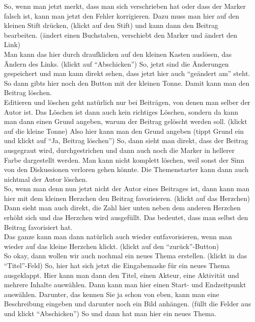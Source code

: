 \begin{itemize}
So, wenn man jetzt merkt, dass man sich verschrieben hat oder dass der Marker falsch ist, kann man jetzt den Fehler korrigieren. Dazu muss man hier auf den kleinen Stift dr{\"u}cken, (klickt auf den Stift) und kann dann den Beitrag bearbeiten. ({\"a}ndert einen Buchstaben, verschiebt den Marker und {\"a}ndert den Link)\\
Man kann das hier durch draufklicken auf den kleinen Kasten ausl{\"o}sen, das {\"A}ndern des Links. (klickt auf "`Abschicken"') So, jetzt sind die {\"A}nderungen gespeichert und man kann direkt sehen, dass jetzt hier auch "`ge{\"a}ndert am"' steht. So dann gibts hier noch den Button mit der kleinen Tonne. Damit kann man den Beitrag l{\"o}schen.\\
Editieren und l{\"o}schen geht nat{\"u}rlich nur bei Beitr{\"a}gen, von denen man selber der Autor ist. Das L{\"o}schen ist dann auch kein richtiges L{\"o}schen, sondern da kann man dann einen Grund angeben, warum der Beitrag gel{\"o}scht werden soll. (klickt auf die kleine Tonne) Also hier kann man den Grund angeben (tippt Grund ein und klickt auf "`Ja, Beitrag l{\"o}schen"') So, dann sieht man direkt, dass der Beitrag ausgegraut wird, durchgestrichen und dann auch noch die Marker in hellerer Farbe dargestellt werden. Man kann nicht komplett l{\"o}schen, weil sonst der Sinn von den Diskussionen verloren gehen k{\"o}nnte. Die Themenstarter kann dann auch nichtmal der Autor l{\"o}schen.\\
So, wenn man denn nun jetzt nicht der Autor eines Beitrages ist, dann kann man hier mit dem kleinen Herzchen den Beitrag favorisieren. (klickt auf das Herzchen) Dann sieht man auch direkt, die Zahl hier unten neben dem anderen Herzchen erh{\"o}ht sich und das Herzchen wird ausgef{\"u}llt. Das bedeutet, dass man selbst den Beitrag favorisiert hat.\\
Das ganze kann man dann nat{\"u}rlich auch wieder entfavorisieren, wenn man wieder auf das kleine Herzchen klickt. (klickt auf den "`zur{\"u}ck"'-Button)\\
So okay, dann wollen wir auch nochmal ein neues Thema erstellen. (klickt in das "`Titel"'-Feld) So, hier hat sich jetzt die Eingabemaske f{\"u}r ein neues Thema ausgeklappt. Hier kann man dann den Titel, einen Akteur, eine Aktivit{\"a}t und mehrere Inhalte ausw{\"a}hlen. Dann kann man hier einen Start- und Endzeitpunkt ausw{\"a}hlen. Darunter, das kennen Sie ja schon von eben, kann man eine Beschreibung eingeben und darunter noch ein Bild anh{\"a}ngen. (f{\"u}llt die Felder aus und klickt "`Abschicken"') So und dann hat man hier ein neues Thema.\\

\end{itemize}
